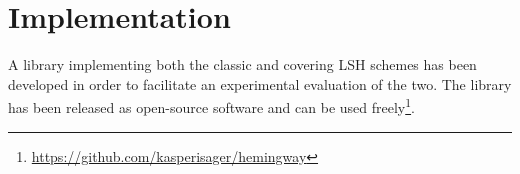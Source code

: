 \section{Implementation}
\label{implementation}

A library implementing both the classic and covering LSH schemes has been developed in order to facilitate an experimental evaluation of the two. The library has been released as open-source software and can be used freely\footnote{\url{https://github.com/kasperisager/hemingway}}.
